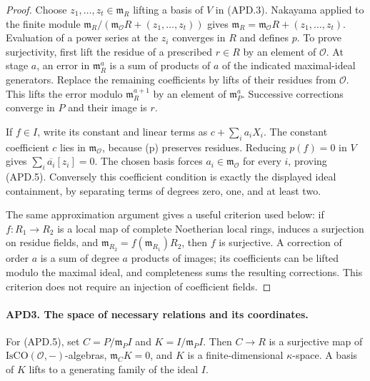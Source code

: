 \documentclass[11pt,a4paper]{article}
\numberwithin{equation}{section}
\theoremstyle{remark}\newtheorem{remark}[theorem]{Remark}
\begin{document}
\begin{proof}
Choose \(z_1,\ldots,z_t\in\mathfrak m_R\) lifting a basis
of \(V\) in (APD.3).  Nakayama applied to the finite module
\(\mathfrak m_R/(\mathfrak m_{\mathcal O}R+(z_1,\ldots,z_t))\)
gives
\(\mathfrak m_R=\mathfrak m_{\mathcal O}R+(z_1,\ldots,z_t)\).
Evaluation of a power series at the \(z_i\) converges in \(R\)
and defines \(p\).  To prove surjectivity, first lift the residue
of a prescribed \(r\in R\) by an element of \(\mathcal O\).
At stage \(a\), an error in \(\mathfrak m_R^a\) is a sum of
products of \(a\) of the indicated maximal-ideal generators.
Replace the remaining coefficients by lifts of their residues from
\(\mathcal O\).  This lifts the error modulo
\(\mathfrak m_R^{a+1}\) by an element of \(\mathfrak m_P^a\).
Successive corrections converge in \(P\) and their image is \(r\).

If \(f\in I\), write its constant and linear terms as
\(c+\sum_i a_iX_i\).  The constant coefficient \(c\) lies
in \(\mathfrak m_{\mathcal O}\), because (p) preserves
residues.  Reducing \(p(f)=0\) in \(V\) gives
\(\sum_i\overline{a_i}[z_i]=0\).  The chosen basis forces
\(a_i\in\mathfrak m_{\mathcal O}\) for every \(i\), proving
(APD.5).  Conversely this coefficient condition is exactly the
displayed ideal containment, by separating terms of degrees zero,
one, and at least two.

The same approximation argument gives a useful criterion used below:
if \(f:R_1\to R_2\) is a local map of complete Noetherian local
rings, induces a surjection on residue fields, and
\(\mathfrak m_{R_2}=f(\mathfrak m_{R_1})R_2\), then \(f\)
is surjective.  A correction of order \(a\) is a sum of degree
\(a\) products of images; its coefficients can be lifted modulo
the maximal ideal, and completeness sums the resulting corrections.
This criterion does not require an injection of coefficient fields.
\end{proof}

\paragraph{APD3. The space of necessary relations and its coordinates.}
\label{claim:APD3}
For (APD.5), set \(C=P/\mathfrak m_PI\) and
\(K=I/\mathfrak m_PI\).  Then \(C\to R\) is a surjective
map of \(\mathrm{IsCO}(\mathcal O,-)\)-algebras,
\(\mathfrak m_CK=0\), and \(K\) is a finite-dimensional
\(\kappa\)-space.  A basis of \(K\) lifts to a generating
family of the ideal \(I\).
\end{document}
